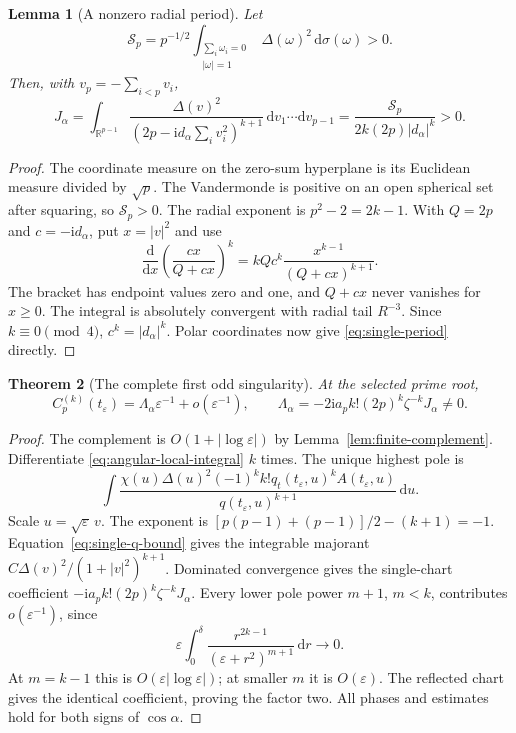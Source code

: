 \documentclass[11pt]{article}
\numberwithin{equation}{section}
\newtheorem{theorem}{Theorem}[section]
\newtheorem{lemma}[theorem]{Lemma}
\theoremstyle{remark}\newtheorem{remark}[theorem]{Remark}
\newcommand{\ii}{\mathrm i}
\newcommand{\dd}{\mathrm d}
\begin{document}
\begin{lemma}[A nonzero radial period]\label{lem:single-period}
Let
\[
 \mathcal S_p=p^{-1/2}
       \int_{\substack{\sum_i\omega_i=0\\|\omega|=1}}
            \Delta(\omega)^2\,\dd\sigma(\omega)>0.
\]
Then, with $v_p=-\sum_{i<p}v_i$,
\begin{equation}\label{eq:single-period}
 J_\alpha=\int_{\mathbb R^{p-1}}
       \frac{\Delta(v)^2}{(2p-\ii d_\alpha\sum_i v_i^2)^{k+1}}
                \,\dd v_1\cdots\dd v_{p-1}
       =\frac{\mathcal S_p}{2k(2p)|d_\alpha|^k}>0.
\end{equation}
\end{lemma}
\begin{proof}
The coordinate measure on the zero-sum hyperplane is its
Euclidean measure divided by $\sqrt p$.
The Vandermonde is positive on an open spherical set after
squaring, so $\mathcal S_p>0$.
The radial exponent is $p^2-2=2k-1$.
With $Q=2p$ and $c=-\ii d_\alpha$, put $x=|v|^2$ and use
\[
 \frac{\dd}{\dd x}\left(\frac{cx}{Q+cx}\right)^k
       =kQc^k\frac{x^{k-1}}{(Q+cx)^{k+1}}.
\]
The bracket has endpoint values zero and one, and $Q+cx$ never
vanishes for $x\ge0$. The integral is absolutely convergent
with radial tail $R^{-3}$.
Since $k\equiv0\pmod4$, $c^k=|d_\alpha|^k$.
Polar coordinates now give \eqref{eq:single-period} directly.
\end{proof}

\begin{theorem}[The complete first odd singularity]\label{thm:single-first}
At the selected prime root,
\[
 C_p^{(k)}(t_\varepsilon)=\Lambda_\alpha\varepsilon^{-1}
           +o(\varepsilon^{-1}),\qquad
 \Lambda_\alpha=-2\ii a_p k!(2p)^k\zeta^{-k}J_\alpha\ne0.
\]
\end{theorem}
\begin{proof}
The complement is $O(1+|\log\varepsilon|)$ by
Lemma~\ref{lem:finite-complement}.
Differentiate \eqref{eq:angular-local-integral} $k$ times.
The unique highest pole is
\[
 \int \frac{\chi(u)\Delta(u)^2(-1)^k k!
       q_t(t_\varepsilon,u)^k A(t_\varepsilon,u)}
                {q(t_\varepsilon,u)^{k+1}}\,\dd u.
\]
Scale $u=\sqrt\varepsilon\,v$. The exponent is
$[p(p-1)+(p-1)]/2-(k+1)=-1$.
Equation~\eqref{eq:single-q-bound} gives the integrable majorant
$C\Delta(v)^2/(1+|v|^2)^{k+1}$.
Dominated convergence gives the single-chart coefficient
$-\ii a_p k!(2p)^k\zeta^{-k}J_\alpha$.
Every lower pole power $m+1$, $m<k$, contributes $o(\varepsilon^{-1})$,
since
\[
 \varepsilon\int_0^\delta
       \frac{r^{2k-1}}{(\varepsilon+r^2)^{m+1}}\,\dd r\longrightarrow0.
\]
At $m=k-1$ this is $O(\varepsilon|\log\varepsilon|)$;
at smaller $m$ it is $O(\varepsilon)$.
The reflected chart gives the identical coefficient, proving the
factor two. All phases and estimates hold for both signs of
$\cos\alpha$.
\end{proof}
\end{document}
